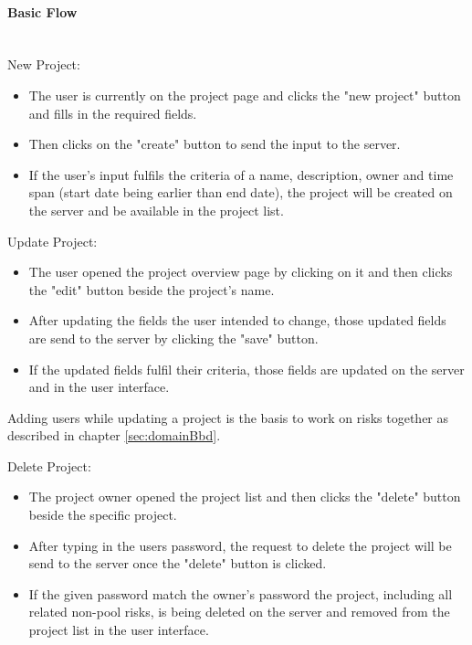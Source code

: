 \paragraph*{Basic Flow} \mbox{}\\
\noindent
New Project:
\begin{itemize}
	\vspace{-3mm}
	\setlength\itemsep{-1em}
	
	\item The user is currently on the project page and clicks the "new project" button and fills in the required fields.
	\item Then clicks on the "create" button to send the input to the server.
	\item If the user's input fulfils the criteria of a name, description, owner and time span (start date being earlier than end date), the project will be created on the server and be available in the project list.
\end{itemize}

\noindent
Update Project: 
\begin{itemize}
	\vspace{-3mm}
	\setlength\itemsep{-1em}
	\item The user opened the project overview page by clicking on it and then clicks the "edit" button beside the project's name.
	\item After updating the fields the user intended to change, those updated fields are send to the server by clicking the "save" button.
	\item If the updated fields fulfil their criteria, those fields are updated on the server and in the user interface.
\end{itemize} 
Adding users while updating a project is the basis to work on risks together as described in chapter \ref{sec:domainBbd}.

\noindent
Delete Project:
\begin{itemize}
	\vspace{-3mm}
	\setlength\itemsep{-1em}
	\item The project owner opened the project list and then clicks the "delete" button beside the specific project. 
	\item After typing in the users password, the request to delete the project will be send to the server once the "delete" button is clicked.
	\item If the given password match the owner's password the project, including all related non-pool risks, is being deleted on the server and removed from the project list in the user interface.
\end{itemize}

